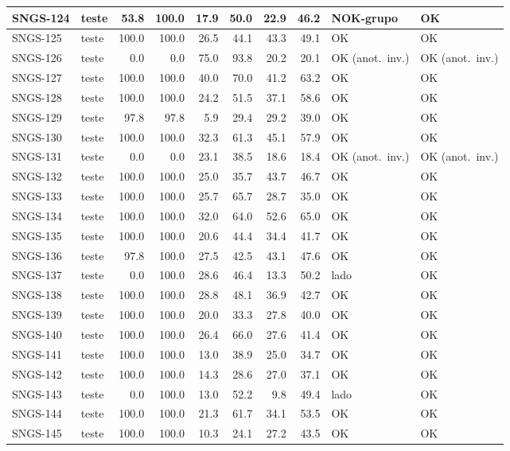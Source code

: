 \begin{small}
\begin{longtable}{|l|l|r|r|r|r|r|r|l|l|}
SNGS-124 & teste & 53.8 & 100.0 & 17.9 & 50.0 & 22.9 & 46.2 & NOK-grupo & OK \\ \hline
SNGS-125 & teste & 100.0 & 100.0 & 26.5 & 44.1 & 43.3 & 49.1 & OK & OK \\ \hline
SNGS-126 & teste & 0.0 & 0.0 & 75.0 & 93.8 & 20.2 & 20.1 & OK (anot.\ inv.) & OK (anot.\ inv.) \\ \hline
SNGS-127 & teste & 100.0 & 100.0 & 40.0 & 70.0 & 41.2 & 63.2 & OK & OK \\ \hline
SNGS-128 & teste & 100.0 & 100.0 & 24.2 & 51.5 & 37.1 & 58.6 & OK & OK \\ \hline
SNGS-129 & teste & 97.8 & 97.8 & 5.9 & 29.4 & 29.2 & 39.0 & OK & OK \\ \hline
SNGS-130 & teste & 100.0 & 100.0 & 32.3 & 61.3 & 45.1 & 57.9 & OK & OK \\ \hline
SNGS-131 & teste & 0.0 & 0.0 & 23.1 & 38.5 & 18.6 & 18.4 & OK (anot.\ inv.) & OK (anot.\ inv.) \\ \hline
SNGS-132 & teste & 100.0 & 100.0 & 25.0 & 35.7 & 43.7 & 46.7 & OK & OK \\ \hline
SNGS-133 & teste & 100.0 & 100.0 & 25.7 & 65.7 & 28.7 & 35.0 & OK & OK \\ \hline
SNGS-134 & teste & 100.0 & 100.0 & 32.0 & 64.0 & 52.6 & 65.0 & OK & OK \\ \hline
SNGS-135 & teste & 100.0 & 100.0 & 20.6 & 44.4 & 34.4 & 41.7 & OK & OK \\ \hline
SNGS-136 & teste & 97.8 & 100.0 & 27.5 & 42.5 & 43.1 & 47.6 & OK & OK \\ \hline
SNGS-137 & teste & 0.0 & 100.0 & 28.6 & 46.4 & 13.3 & 50.2 & lado & OK \\ \hline
SNGS-138 & teste & 100.0 & 100.0 & 28.8 & 48.1 & 36.9 & 42.7 & OK & OK \\ \hline
SNGS-139 & teste & 100.0 & 100.0 & 20.0 & 33.3 & 27.8 & 40.0 & OK & OK \\ \hline
SNGS-140 & teste & 100.0 & 100.0 & 26.4 & 66.0 & 27.6 & 41.4 & OK & OK \\ \hline
SNGS-141 & teste & 100.0 & 100.0 & 13.0 & 38.9 & 25.0 & 34.7 & OK & OK \\ \hline
SNGS-142 & teste & 100.0 & 100.0 & 14.3 & 28.6 & 27.0 & 37.1 & OK & OK \\ \hline
SNGS-143 & teste & 0.0 & 100.0 & 13.0 & 52.2 & 9.8 & 49.4 & lado & OK \\ \hline
SNGS-144 & teste & 100.0 & 100.0 & 21.3 & 61.7 & 34.1 & 53.5 & OK & OK \\ \hline
SNGS-145 & teste & 100.0 & 100.0 & 10.3 & 24.1 & 27.2 & 43.5 & OK & OK \\ \hline

\end{longtable}
\end{small}
